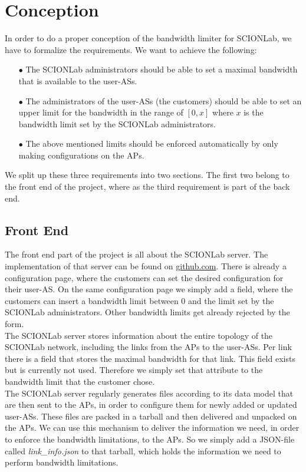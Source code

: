 \chapter{Conception}
In order to do a proper conception of the bandwidth limiter for \acs{SCIONLab}, we have to formalize the requirements. We want to achieve the following:

\begin{enumerate}
\item[$\bullet$]The \acs{SCIONLab} administrators should be able to set a maximal bandwidth that is available to the user-\acsp{AS}.
\item[$\bullet$]The administrators of the user-\acsp{AS} (the customers) should be able to set an upper limit for the bandwidth in the range of $[0,x]$ where $x$ is the bandwidth limit set by the \acs{SCIONLab} administrators.
\item[$\bullet$] The above mentioned limits should be enforced automatically by only making configurations on the \acsp{AP}.
\end{enumerate}

We split up these three requirements into two sections. The first two belong to the front end of the project, where as the third requirement is part of the back end.

\section{Front End}

The front end part of the project is all about the \acs{SCIONLab} server. The implementation of that server can be found on \href{https://github.com/ManuelMeinen/scionlab/tree/bw-limit}{github.com}\cite{meinen2019scionlab}. There is already a configuration page, where the customers can set the desired configuration for their user-\acs{AS}. On the same configuration page we simply add a field, where the customers can insert a bandwidth limit between 0 and the limit set by the \acs{SCIONLab} administrators. Other bandwidth limits get already rejected by the form.
\\
The \acs{SCIONLab} server stores information about the entire topology of the \acs{SCIONLab} network, including the links from the \acsp{AP} to the user-\acsp{AS}. Per link there is a field that stores the maximal bandwidth for that link. This field exists but is currently not used. Therefore we simply set that attribute to the bandwidth limit that the customer chose.
\\
The \acs{SCIONLab} server regularly generates files according to its data model that are then sent to the \acsp{AP}, in order to configure them for newly added or updated user-\acsp{AS}. These files are packed in a tarball and then delivered and unpacked on the \acsp{AP}. We can use this mechanism to deliver the information we need, in order to enforce the bandwidth limitations, to the \acsp{AP}. So we simply add a \ac{JSON}-file called \textit{link\_info.json} to that tarball, which holds the information we need to perform bandwidth limitations.

